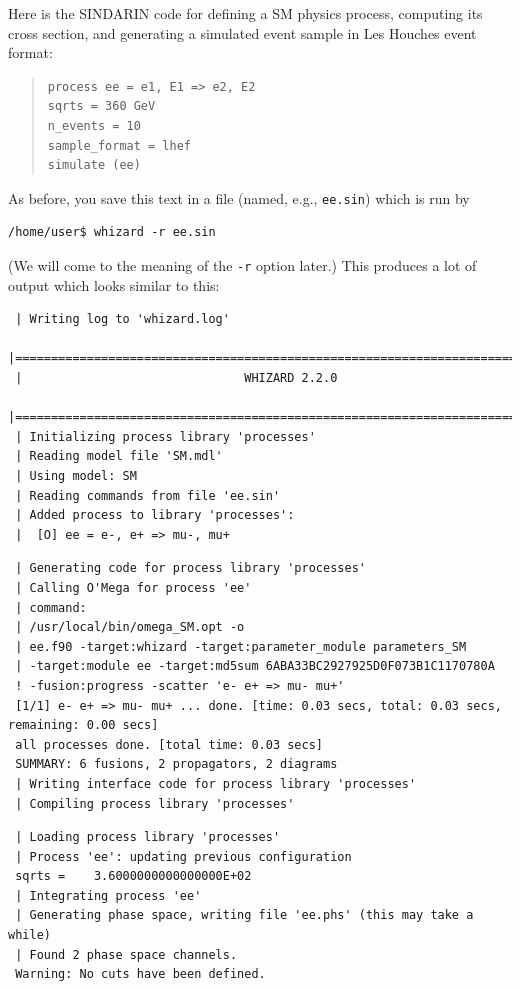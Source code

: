 \documentclass[12pt]{book}
\begin{document}
Here is the SINDARIN code for defining a SM physics process, computing
its cross section, and generating a simulated event sample in Les Houches
event format:
\begin{quote}
\begin{verbatim}
process ee = e1, E1 => e2, E2
sqrts = 360 GeV
n_events = 10
sample_format = lhef
simulate (ee)
\end{verbatim}
\end{quote}
As before, you save this text in a file (named, e.g., 
\verb|ee.sin|) which is run by
\begin{verbatim}
/home/user$ whizard -r ee.sin
\end{verbatim}
(We will come to the meaning of the \verb|-r| option later.)
This produces a lot of output which looks similar to this:

 \begin{footnotesize}
 \begin{verbatim}
 | Writing log to 'whizard.log'
 |=============================================================================|
 |                               WHIZARD 2.2.0
 |=============================================================================|
 | Initializing process library 'processes'
 | Reading model file 'SM.mdl'
 | Using model: SM
 | Reading commands from file 'ee.sin'
 | Added process to library 'processes':
 |  [O] ee = e-, e+ => mu-, mu+
 \end{verbatim}

 \begin{verbatim}
 | Generating code for process library 'processes'
 | Calling O'Mega for process 'ee'
 | command:
 | /usr/local/bin/omega_SM.opt -o
 | ee.f90 -target:whizard -target:parameter_module parameters_SM
 | -target:module ee -target:md5sum 6ABA33BC2927925D0F073B1C1170780A 
 ! -fusion:progress -scatter 'e- e+ => mu- mu+'
 [1/1] e- e+ => mu- mu+ ... done. [time: 0.03 secs, total: 0.03 secs, remaining: 0.00 secs]
 all processes done. [total time: 0.03 secs]
 SUMMARY: 6 fusions, 2 propagators, 2 diagrams
 | Writing interface code for process library 'processes'
 | Compiling process library 'processes'
 \end{verbatim}


 \begin{verbatim}
 | Loading process library 'processes'
 | Process 'ee': updating previous configuration
 sqrts =    3.6000000000000000E+02
 | Integrating process 'ee'
 | Generating phase space, writing file 'ee.phs' (this may take a while)
 | Found 2 phase space channels.
 Warning: No cuts have been defined.
 \end{verbatim}



\end{footnotesize}
\end{document}
